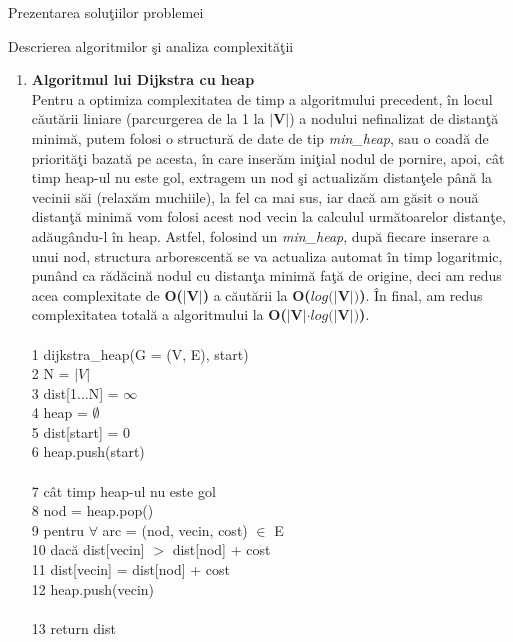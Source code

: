 \documentclass[a4paper]{article}
\begin{document}
\begin{section}{Prezentarea solu\c tiilor problemei\\}
\begin{subsection}{Descrierea algoritmilor \c si analiza complexit\u a\c tii\\}
\begin{enumerate}
	\item \textbf{Algoritmul lui Dijkstra cu heap} \\[0.4cm]
	Pentru a optimiza complexitatea de timp a algoritmului precedent, \^ in locul c\u aut\u arii liniare (parcurgerea de la 1 la \textbf{$|$V$|$}) a nodului nefinalizat de distan\c t\u a minim\u a, putem folosi o structur\u a de date de tip \textit{min\_heap}, sau o coad\u a de priorit\u a\c ti bazat\u a pe acesta, \^ in care inser\u am ini\c tial nodul de pornire, apoi, c\^ at timp heap-ul nu este gol, extragem un nod \c si actualiz\u am distan\c tele p\^ an\u a la vecinii s\u ai (relax\u am muchiile), la fel ca mai sus, iar dac\u a am g\u asit o nou\u a distan\c t\u a minim\u a vom folosi acest nod vecin la calculul urm\u atoarelor distan\c te, ad\u aug\^ andu-l \^ in heap. Astfel, folosind un \textit{min\_heap}, dup\u a fiecare inserare a unui nod, structura arborescent\u a se va actualiza automat \^ in timp logaritmic, pun\^ and ca r\u ad\u acin\u a nodul cu distan\c ta minim\u a fa\c t\u a de origine, deci am redus acea complexitate de \textbf{O($|$V$|$)} a c\u aut\u arii la \textbf{O($log(|$V$|)$)}.
\^ In final, am redus complexitatea total\u a a algoritmului la \textbf{O($|$V$|$$\cdot$$log(|$V$|)$)}.
\\ \\
	1 \quad dijkstra\_heap(G = (V, E), start) \\
	2 \quad\quad\quad N = $|V|$ \\
	3 \quad\quad\quad dist[1...N] = $\infty$ \\
	4 \quad\quad\quad heap = $\emptyset$ \\
	5 \quad\quad\quad dist[start] = 0 \\
	6 \quad\quad\quad heap.push(start) \\ \\
	7 \quad\quad\quad c\^ at timp heap-ul nu este gol \\
	8 \quad\quad\quad\quad\quad nod = heap.pop() \\
	9   \quad\quad\quad\quad\quad pentru $\forall$ arc = (nod, vecin, cost) $\in$ E \\
 	10 \quad\quad\quad\quad\quad\quad\quad dac\u a dist[vecin] $>$ dist[nod] + cost \\
	11 \quad\quad\quad\quad\quad\quad\quad\quad\quad  dist[vecin] = dist[nod] + cost \\
	12 \quad\quad\quad\quad\quad\quad\quad\quad\quad  heap.push(vecin) \\ \\
	13 \quad\quad\quad return dist \\ \\


\end{enumerate}
\end{subsection}
\end{section}
\end{document}
